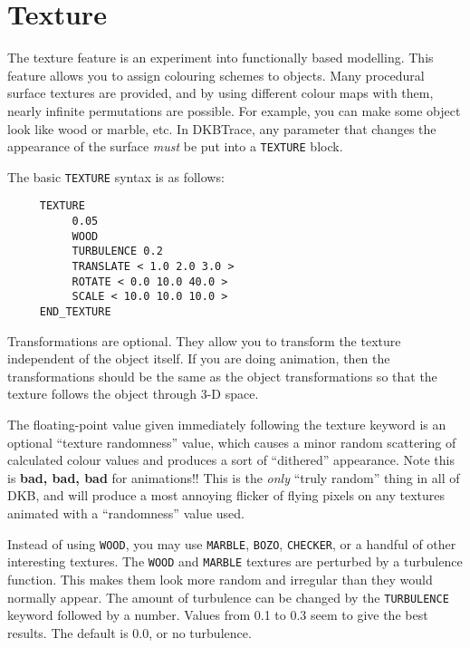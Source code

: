 \section{Texture}

The texture feature is an experiment into functionally based modelling.  This
feature allows you to assign colouring schemes to objects.  Many procedural
surface textures are provided, and by using different colour maps with them,
nearly infinite permutations are possible.  For example, you can make some
object look like wood or marble, etc.  In DKBTrace, any parameter that changes
the appearance of the surface {\em must} be put into a
{\tt TEXTURE} block.

The basic {\tt TEXTURE} syntax is as follows:
\begin{verbatim}
     TEXTURE
          0.05
          WOOD
          TURBULENCE 0.2
          TRANSLATE < 1.0 2.0 3.0 >
          ROTATE < 0.0 10.0 40.0 >
          SCALE < 10.0 10.0 10.0 >
     END_TEXTURE
\end{verbatim}
Transformations are optional.  They allow you to transform the texture
independent of the object itself.  If you are doing animation, then the
transformations should be the same as the object transformations so that the
texture follows the object through 3-D space.

The
floating-point value given immediately following the texture
keyword is an optional ``texture randomness'' value, which causes a
minor random scattering of calculated colour values and produces a
sort of ``dithered'' appearance.  Note this is {\bf bad, bad, bad} for
animations!!  This is the {\em only} ``truly random'' thing in all of
DKB, and will produce a most annoying flicker of flying pixels on any
textures animated with a ``randomness'' value used.

Instead of using
{\tt WOOD}, you may use
{\tt MARBLE},
{\tt BOZO},
{\tt CHECKER}, or a handful of other interesting
textures.  The
{\tt WOOD} and {\tt MARBLE} textures are perturbed by a turbulence
function.  This makes them look more random and irregular than they
would normally appear.  The amount of turbulence
can be changed by the
{\tt TURBULENCE} keyword followed by a number.
Values from 0.1 to 0.3
seem to give the best results.  The default is 0.0, or no turbulence.

